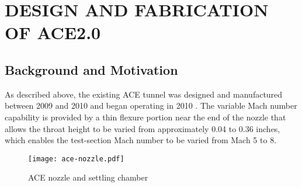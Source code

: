 %
%  
%



\chapter{DESIGN AND FABRICATION OF ACE2.0}

\section{Background and Motivation}

As described above, the existing ACE tunnel was designed and manufactured between 2009 and 2010 and began operating in 2010 \cite{ace09,ace10-calibrate,tichenor-dis}. The variable Mach number capability is provided by a thin flexure portion near the end of the nozzle that allows the throat height to be varied from approximately 0.04 to 0.36 inches, which enables the test-section Mach number to be varied from Mach 5 to 8. 


\begin{figure}[ht!]
    \centering
    \texttt{[image: ace-nozzle.pdf]}
    \caption{ACE nozzle and settling chamber}
    \label{fig:ace-nozzle}
\end{figure}


